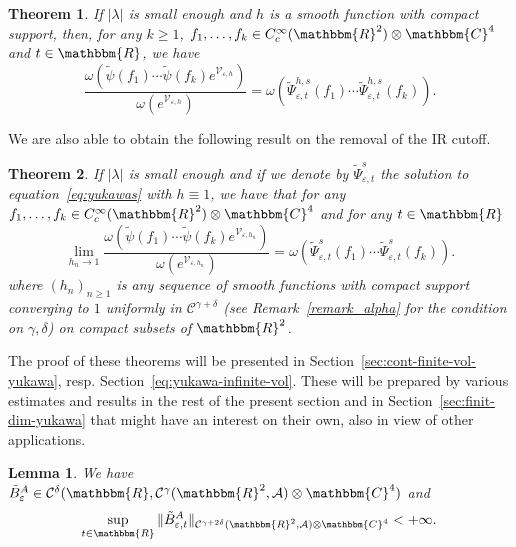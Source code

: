\documentclass[11pt]{article}
\newtheorem{lemma}{Lemma}
\newtheorem{theorem}{Theorem}
\begin{document}
\begin{theorem}
  \label{theorem_main1}If $| \lambda |$ is small enough and $h$ is a smooth
  function with compact support, then, for any $k \geqslant 1$, $f_1, \ldots,
  f_k \in C^{\infty}_c (\mathbbm{R}^2) \otimes \mathbbm{C}^4$ and $t \in
  \mathbbm{R}$, we have
  \begin{equation}
    \frac{\omega (\tilde{\psi} (f_1) \cdots \tilde{\psi} (f_k)
    e^{\mathcal{V}_{\varepsilon, h}})}{\omega (e^{\mathcal{V}_{\varepsilon,
    h}})} = \omega (\tilde{\Psi}_{\varepsilon, t}^{h, s} (f_1) \cdots
    \tilde{\Psi}_{\varepsilon, t}^{h, s} (f_k)) .
  \end{equation}
\end{theorem}

We are also able to obtain the following result on the removal of the IR
cutoff.

\begin{theorem}
  \label{theorem_main2}If $| \lambda |$ is small enough and if we denote by
  $\tilde{\Psi}_{\varepsilon, t}^s$ the solution to
  equation~{\eqref{eq:yukawas}} with $h \equiv 1$, we have that for any $f_1,
  \ldots, f_k \in C^{\infty}_c (\mathbbm{R}^2) \otimes \mathbbm{C}^4$ and for
  any $t \in \mathbbm{R}$
  \begin{equation}
    \lim_{h_n \rightarrow 1} \frac{\omega \left( \tilde{\psi} (f_1) \cdots
    \tilde{\psi} (f_k) e^{\mathcal{V}_{\varepsilon, h_n}} \right)}{\omega
    \left( e^{\mathcal{V}_{\varepsilon, h_n}} \right)} = \omega
    (\tilde{\Psi}_{\varepsilon, t}^s (f_1) \cdots \tilde{\Psi}_{\varepsilon,
    t}^s (f_k)) .
  \end{equation}
  where $(h_n)_{n \geqslant 1}$ is any sequence of smooth functions with
  compact support converging to $1$ uniformly in $\mathcal{C}^{\gamma +
  \delta}$ (see Remark~\ref{remark_alpha} for the condition on $\gamma,
  \delta$) on compact subsets of $\mathbbm{R}^2$.
\end{theorem}

The proof of these theorems will be presented in
Section~\ref{sec:cont-finite-vol-yukawa}, resp.
Section~\ref{eq:yukawa-infinite-vol}. These will be prepared by various
estimates and results in the rest of the present section and in
Section~\ref{sec:finit-dim-yukawa} that might have an interest on their own,
also in view of other applications.

\begin{lemma}
  \label{lemma_noise}We have $\tilde{B}^A_{\varepsilon} \in
  \mathcal{C}^{\delta} (\mathbbm{R}, \mathcal{C}^{\gamma} (\mathbbm{R}^2,
  \mathcal{A}) \otimes \mathbbm{C}^4)$ and
  \[ \sup_{t \in \mathbbm{R}} \| \tilde{B}^A_{\varepsilon, t}
     \|_{\mathcal{C}^{\gamma + 2 \delta} (\mathbbm{R}^2, \mathcal{A}) \otimes
     \mathbbm{C}^4} < + \infty ._{} \]
\end{lemma}
\end{document}
